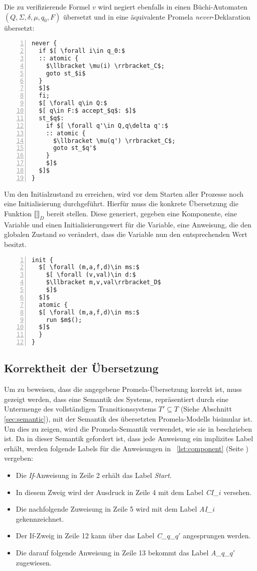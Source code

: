 Die zu verifizierende Formel $v$ wird negiert ebenfalls in einen Büchi-Automaten $(Q,\Sigma,\delta,\mu,q_0,F)$ übersetzt und in eine äquivalente Promela \emph{never}-Deklaration übersetzt:
\begin{lstlisting}[language=Promela,mathescape=true,numbers=left,numberstyle=\small,caption={Verifikationsziel-Übersetzung als \emph{never}-Prozess}]
never {
  if $[ \forall i\in q_0:$
  :: atomic {
    $\llbracket \mu(i) \rrbracket_C$;
    goto st_$i$
  }
  $]$
  fi;
  $[ \forall q\in Q:$
  $[ q\in F:$ accept_$q$: $]$
  st_$q$:
    if $[ \forall q'\in Q,q\delta q':$
    :: atomic {
      $\llbracket \mu(q') \rrbracket_C$;
      goto st_$q'$
    }
    $]$
  $]$
}
\end{lstlisting}

Um den Initialzustand zu erreichen, wird vor dem Starten aller Prozesse noch eine Initialisierung durchgeführt.
Hierfür muss die konkrete Übersetzung die Funktion $\llbracket\rrbracket_D$ bereit stellen.
Diese generiert, gegeben eine Komponente, eine Variable und einen Initialisierungswert für die Variable, eine Anweisung, die den globalen Zustand so verändert, dass die Variable nun den entsprechenden Wert besitzt.
\begin{lstlisting}[language=Promela,mathescape=true,numbers=left,numberstyle=\small,caption={Initialisierungsprozess}]
init {
  $[ \forall (m,a,f,d)\in ms:$
    $[ \forall (v,val)\in d:$
    $\llbracket m,v,val\rrbracket_D$
    $]$
  $]$
  atomic {
  $[ \forall (m,a,f,d)\in ms:$
    run $m$();
  $]$
  }
}
\end{lstlisting}

\subsection{Korrektheit der Übersetzung}
Um zu beweisen, dass die angegebene Promela-Übersetzung korrekt ist, muss gezeigt werden, dass eine Semantik des Systems, repräsentiert durch eine Untermenge des vollständigen Transitionssystems $T'\subseteq T$ (Siehe Abschnitt \ref{sec:semantic}), mit der Semantik des übersetzten Promela-Modells bisimular ist.
Um dies zu zeigen, wird die Promela-Semantik verwendet, wie sie in \cite{Gallardo04formalaspects} beschrieben ist.
Da in dieser Semantik gefordert ist, dass jede Anweisung ein implizites Label erhält, werden folgende Labels für die Anweisungen in \lstlistingname~\ref{lst:component} (Seite \pageref{lst:component}) vergeben:
\begin{itemize}
\item Die \emph{If}-Anweisung in Zeile 2 erhält das Label \emph{Start}.
\item In diesem Zweig wird der Ausdruck in Zeile 4 mit dem Label \emph{CI\_$i$} versehen.
\item Die nachfolgende Zuweisung in Zeile 5 wird mit dem Label \emph{AI\_$i$} gekennzeichnet.
\item Der If-Zweig in Zeile 12 kann über das Label \emph{C\_$q$\_$q'$} angesprungen werden.
\item Die darauf folgende Anweisung in Zeile 13 bekommt das Label \emph{A\_$q$\_$q'$} zugewiesen.
\end{itemize}

